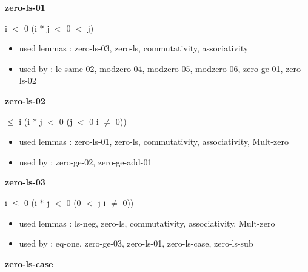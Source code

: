 \documentclass[a4paper]{article}
\begin{document}
\medskip

\bigskip

{\large\bf zero-ls-01}

\medskip

 \Fol i $<$ 0 \Imp (i $*$ j $<$ 0  $<$ j)

\begin{itemize}


\item       used lemmas  : zero-ls-03, zero-ls, commutativity, associativity
\item       used by      : le-same-02, modzero-04, modzero-05, modzero-06, zero-ge-01, zero-ls-02

\end{itemize}

\medskip

\bigskip

{\large\bf zero-ls-02}

\medskip

  $\le$ i \Imp (i $*$ j $<$ 0 \Equiv \Not \Not (j $<$ 0 \And i $\neq$ 0))

\begin{itemize}


\item       used lemmas  : zero-ls-01, zero-ls, commutativity, associativity, Mult-zero
\item       used by      : zero-ge-02, zero-ge-add-01

\end{itemize}

\medskip

\bigskip

{\large\bf zero-ls-03}

\medskip

 \Fol i $\le$ 0 \Imp (i $*$ j $<$ 0 \Equiv \Not \Not (0 $<$ j \And i $\neq$ 0))

\begin{itemize}


\item       used lemmas  : ls-neg, zero-ls, commutativity, associativity, Mult-zero
\item       used by      : eq-one, zero-ge-03, zero-ls-01, zero-ls-case, zero-ls-sub

\end{itemize}

\medskip

\bigskip

{\large\bf zero-ls-case}

\medskip
\end{document}
